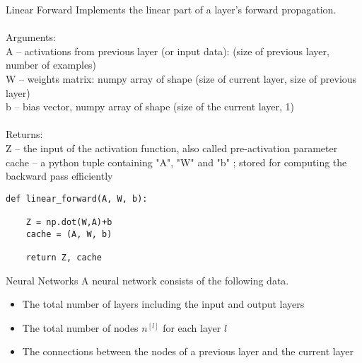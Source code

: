 \documentclass[a4paper]{article}
\begin{document}
\begin{alg}{Linear Forward}{} Implements the linear part of a layer's forward propagation.\\~\\
Arguments:\\
A -- activations from previous layer (or input data): (size of previous layer, number of examples)\\
W -- weights matrix: numpy array of shape (size of current layer, size of previous layer)\\
b -- bias vector, numpy array of shape (size of the current layer, 1)\\~\\
Returns:\\
Z -- the input of the activation function, also called pre-activation parameter\\
cache -- a python tuple containing "A", "W" and "b" ; stored for computing the backward pass efficiently\\
\begin{verbatim}
def linear_forward(A, W, b):

    Z = np.dot(W,A)+b
    cache = (A, W, b)
    
    return Z, cache
\end{verbatim}
\end{alg}

\begin{defn}{Neural Networks}{} A neural network consists of the following data. 
\begin{itemize}
\item The total number of layers including the input and output layers
\item The total number of nodes $n^{[l]}$ for each layer $l$
\item The connections between the nodes of a previous layer and the current layer
\end{itemize}
\end{defn}
\end{document}
